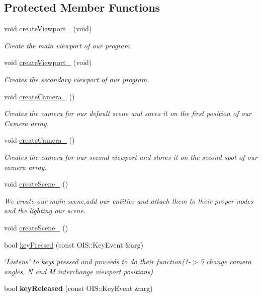 \subsection*{Protected Member Functions}
\begin{DoxyCompactItemize}
\item 
void \hyperlink{class_basic_tutorial__00_a6d4684502f2f7b2cf628a975d7750d8e}{create\+Viewport\+\_} (void)
\begin{DoxyCompactList}\small\item\em Create the main viewport of our program. \end{DoxyCompactList}\item 
void \hyperlink{class_basic_tutorial__00_a2801a2f0d91d80b471da48344d2ccccf}{create\+Viewport\+\_} (void)
\begin{DoxyCompactList}\small\item\em Creates the secondary viewport of our program. \end{DoxyCompactList}\item 
void \hyperlink{class_basic_tutorial__00_a3479c50dbf8dc06a7ea77014eb94c6e7}{create\+Camera\+\_} ()
\begin{DoxyCompactList}\small\item\em Creates the camera for our default scene and saves it on the first position of our Camera array. \end{DoxyCompactList}\item 
void \hyperlink{class_basic_tutorial__00_a8745a127adeb69fa769f832fd41412c0}{create\+Camera\+\_} ()
\begin{DoxyCompactList}\small\item\em Creates the camera for our second viewport and stores it on the second spot of our camera array. \end{DoxyCompactList}\item 
void \hyperlink{class_basic_tutorial__00_aa84173e509858146cbfb98274c1ef56e}{create\+Scene\+\_} ()
\begin{DoxyCompactList}\small\item\em We create our main scene,add our entities and attach them to their proper nodes and the lighting our scene. \end{DoxyCompactList}\item 
void \hyperlink{class_basic_tutorial__00_aad14e1ca565797c4b7dcff31bc0e1494}{create\+Scene\+\_} ()
\item 
bool \hyperlink{class_basic_tutorial__00_adc1a0b32d78b1980b3ee51a1b1e1e69b}{key\+Pressed} (const O\+I\+S\+::\+Key\+Event \&arg)
\begin{DoxyCompactList}\small\item\em \char`\"{}\+Listens\char`\"{} to keys pressed and proceeds to do their function(1-\/$>$5 change camera angles, N and M interchange viewport positions) \end{DoxyCompactList}\item 
\mbox{\label{class_basic_tutorial__00_aacca7a0a2a5a0e0d007b9c6c30b4941b}} 
bool {\bfseries key\+Released} (const O\+I\+S\+::\+Key\+Event \&arg)
\end{DoxyCompactItemize}
